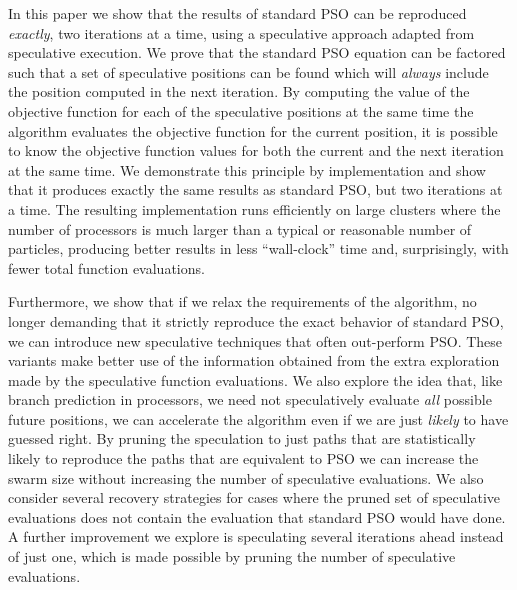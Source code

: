 \documentclass[journal,letterpaper]{IEEEtran}
\begin{document}
% 
% 

In this paper we show that the results of standard PSO can be reproduced
\emph{exactly}, two iterations at a time, using a speculative approach adapted
from speculative execution. We prove that the standard PSO equation can be
factored such that a set of speculative positions can be found which will
\emph{always} include the position computed in the next iteration.  By
computing the value of the objective function for each of the speculative
positions at the same time the algorithm evaluates the objective function for
the current position, it is possible to know the objective function values for
both the current and the next iteration at the same time.  We demonstrate this
principle by implementation and show that it produces exactly the same results
as standard PSO, but two iterations at a time.  The resulting implementation
runs efficiently on large clusters where the number of processors is much
larger than a typical or reasonable number of particles, producing better
results in less ``wall-clock'' time and, surprisingly, with fewer total
function evaluations.

Furthermore, we show that if we relax the requirements of the algorithm, no
longer demanding that it strictly reproduce the exact behavior of standard PSO,
we can introduce new speculative techniques that often out-perform PSO.  These
variants make better use of the information obtained from the extra exploration
made by the speculative function evaluations.  We also explore the idea that,
like branch prediction in processors, we need not speculatively evaluate
\emph{all} possible future positions, we can accelerate the algorithm even if
we are just \emph{likely} to have guessed right.  By pruning the speculation to
just paths that are statistically likely to reproduce the paths that are
equivalent to PSO we can increase the swarm size without increasing the number
of speculative evaluations.  We also consider several recovery strategies for
cases where the pruned set of speculative evaluations does not contain the
evaluation that standard PSO would have done.  A further improvement we explore
is speculating several iterations ahead instead of just one, which is made
possible by pruning the number of speculative evaluations.
\end{document}
